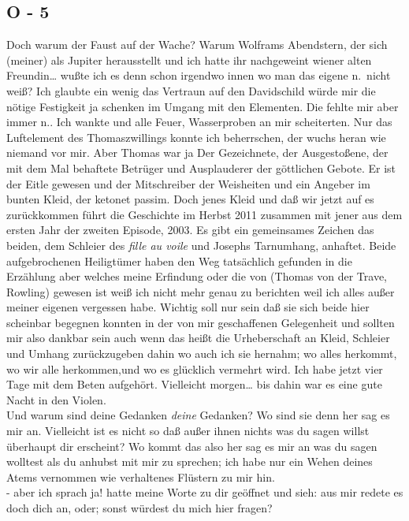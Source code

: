 \documentclass[
]{article}
\author{}
\date{\vspace{-2.5em}}
\begin{document}
\subsection{O - 5}\label{o---5}

Doch warum der Faust auf der Wache? Warum Wolframs Abendstern, der sich
(meiner) als Jupiter herausstellt und ich hatte ihr nachgeweint wiener
alten Freundin\ldots{} wußte ich es denn schon irgendwo innen wo man das
eigene n.~nicht weiß? Ich glaubte ein wenig das Vertraun auf den
Davidschild würde mir die nötige Festigkeit ja schenken im Umgang mit
den Elementen. Die fehlte mir aber immer n.. Ich wankte und alle Feuer,
Wasserproben an mir scheiterten. Nur das Luftelement des Thomaszwillings
konnte ich beherrschen, der wuchs heran wie niemand vor mir. Aber Thomas
war ja Der Gezeichnete, der Ausgestoßene, der mit dem Mal behaftete
Betrüger und Ausplauderer der göttlichen Gebote. Er ist der Eitle
gewesen und der Mitschreiber der Weisheiten und ein Angeber im bunten
Kleid, der ketonet passim. Doch jenes Kleid und daß wir jetzt auf es
zurückkommen führt die Geschichte im Herbst 2011 zusammen mit jener aus
dem ersten Jahr der zweiten Episode, 2003. Es gibt ein gemeinsames
Zeichen das beiden, dem Schleier des \emph{fille au voile} und Josephs
Tarnumhang, anhaftet. Beide aufgebrochenen Heiligtümer haben den Weg
tatsächlich gefunden in die Erzählung aber welches meine Erfindung oder
die von (Thomas von der Trave, Rowling) gewesen ist weiß ich nicht mehr
genau zu berichten weil ich alles außer meiner eigenen vergessen habe.
Wichtig soll nur sein daß sie sich beide hier scheinbar begegnen konnten
in der von mir geschaffenen Gelegenheit und sollten mir also dankbar
sein auch wenn das heißt die Urheberschaft an Kleid, Schleier und Umhang
zurückzugeben dahin wo auch ich sie hernahm; wo alles herkommt, wo wir
alle herkommen,und wo es glücklich vermehrt wird. Ich habe jetzt vier
Tage mit dem Beten aufgehört. Vielleicht morgen\ldots{} bis dahin war es
eine gute Nacht in den Violen.\\
Und warum sind deine Gedanken \emph{deine} Gedanken? Wo sind sie denn
her sag es mir an. Vielleicht ist es nicht so daß außer ihnen nichts was
du sagen willst überhaupt dir erscheint? Wo kommt das also her sag es
mir an was du sagen wolltest als du anhubst mit mir zu sprechen; ich
habe nur ein Wehen deines Atems vernommen wie verhaltenes Flüstern zu
mir hin.\\
- aber ich sprach ja! hatte meine Worte zu dir geöffnet und sieh: aus
mir redete es doch dich an, oder; sonst würdest du mich hier fragen?\\
\end{document}
